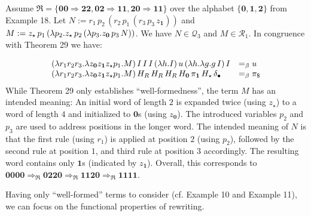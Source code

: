Assume $\mathfrak{R}=\{\mathbf{0}\mathbf{0}\Rightarrow\mathbf{2}\mathbf{2},\mathbf{0}%
\mathbf{2}\Rightarrow\mathbf{1}\mathbf{1},\mathbf{2}\mathbf{0}\Rightarrow%
\mathbf{1}\mathbf{1}\}$ over the alphabet $\{\mathbf{0},\mathbf{1},\mathbf{2}\}$ from Example 18. Let $N:=r_{1}\,p_{2}\,(r_{2}\,p_{1}\,(r_{3}\,p_{3}\,z_{\mathbf{1}}))$ and $M:=z_{\star}\,p_{1}\,(\lambda p_{2}.z_{\star}\,p_{2}\,(\lambda p_{3}.z_{%
\mathbf{0}}\,p_{3}\,N))$. We have $N\in\mathcal{Q}_{3}$ and $M\in\mathcal{R}_{1}$. In congruence with Theorem 29 we have:\par
    \[\begin{array}[]{ll}(\lambda r_{1}r_{2}r_{3}.\lambda z_{\mathbf{0}}z_{\mathbf{1%
}}z_{\star}p_{1}.M)\,I\,I\,I\,(\lambda h.I)\,u\,(\lambda h.\lambda g.g\,I)\,I&%
=_{\beta}u\\
(\lambda r_{1}r_{2}r_{3}.\lambda z_{\mathbf{0}}z_{\mathbf{1}}z_{\star}p_{1}.M)%
\,H_{R}\,H_{R}\,H_{R}\,H_{\mathbf{0}}\,\pi_{\mathbf{1}}\,H_{\star}\,\delta_{%
\bullet}&=_{\beta}\pi_{\$}\end{array}\]    
While Theorem 29 only establishes “well-formedness”, the term $M$ has an intended meaning: An initial word of length $2$ is expanded twice (using $z_{\star}$) to a word of length $4$ and initialized to $\mathbf{0}$s (using $z_{\mathbf{0}}$). The introduced variables $p_{2}$ and $p_{3}$ are used to address positions in the longer word. The intended meaning of $N$ is that the first rule (using $r_{1}$) is applied at position $2$ (using $p_{2}$), followed by the second rule at position $1$, and third rule at position $3$ accordingly. The resulting word contains only $\mathbf{1}$s (indicated by $z_{\mathbf{1}}$). Overall, this corresponds to $\mathbf{0}\mathbf{0}\mathbf{0}\mathbf{0}\Rightarrow_{\mathfrak{R}}\mathbf{0}%
\mathbf{2}\mathbf{2}\mathbf{0}\Rightarrow_{\mathfrak{R}}\mathbf{1}\mathbf{1}%
\mathbf{2}\mathbf{0}\Rightarrow_{\mathfrak{R}}\mathbf{1}\mathbf{1}\mathbf{1}%
\mathbf{1}$.\par
 
 
 
 
Having only “well-formed” terms to consider (cf. Example 10 and Example 11), we can focus on the functional properties of rewriting.\par
 
 
 
